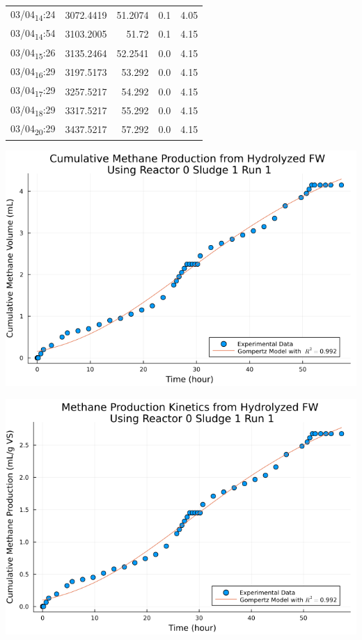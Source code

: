 \documentclass[11pt]{article}
\begin{document}
\begin{center}
\begin{tabular}{lrrrr}
03/04\textsubscript{14}:24 & 3072.4419 & 51.2074 & 0.1 & 4.05\\[0pt]
03/04\textsubscript{14}:54 & 3103.2005 & 51.72 & 0.1 & 4.15\\[0pt]
03/04\textsubscript{15}:26 & 3135.2464 & 52.2541 & 0.0 & 4.15\\[0pt]
03/04\textsubscript{16}:29 & 3197.5173 & 53.292 & 0.0 & 4.15\\[0pt]
03/04\textsubscript{17}:29 & 3257.5217 & 54.292 & 0.0 & 4.15\\[0pt]
03/04\textsubscript{18}:29 & 3317.5217 & 55.292 & 0.0 & 4.15\\[0pt]
03/04\textsubscript{20}:29 & 3437.5217 & 57.292 & 0.0 & 4.15\\[0pt]
\end{tabular}
\end{center}

\begin{center}
\includegraphics[width=.9\linewidth]{../plots/BMPs/Hydrolyzed FW/methane_kinetics_hydrolysate_0_s1_r1_hour.png}
\end{center}

\begin{center}
\includegraphics[width=.9\linewidth]{../plots/BMPs/Hydrolyzed FW/specific_methane_kinetics_hydrolysate_0_s1_r1_hour.png}
\end{center}
\end{document}
